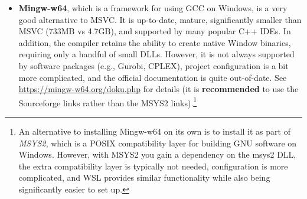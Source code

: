 \documentclass[12pt]{article}
\begin{document}
\begin{itemize}
\begin{itemize}
            \item \textbf{Mingw-w64}, which is a framework for using GCC on Windows, is a very good alternative to MSVC. It is up-to-date, mature, significantly smaller than MSVC (733MB vs 4.7GB), and supported by many popular C++ IDEs. In addition, the compiler retains the ability to create native Window binaries, requiring only a handful of small DLLs. However, it is not always supported by software packages (e.g., Gurobi, CPLEX), project configuration is a bit more complicated, and the official documentation is quite out-of-date. See \url{https://mingw-w64.org/doku.php} for details (it is \textbf{recommended} to use the Sourceforge links rather than the MSYS2 links).\footnote{An alternative to installing Mingw-w64 on its own is to install it as part of \emph{MSYS2}, which is a POSIX compatibility layer for building GNU software on Windows. However, with MSYS2 you gain a dependency on the msys2 DLL, the extra compatibility layer is typically not needed, configuration is more complicated, and WSL provides similar functionality while also being significantly easier to set up.}
        \end{itemize}
\end{itemize}
\end{document}
